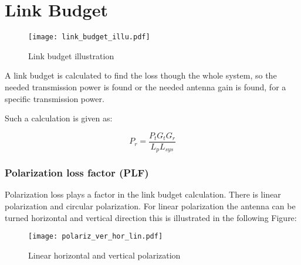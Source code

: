 \chapter{Link Budget}

\begin{figure}[H]
\centering
\texttt{[image: link\_budget\_illu.pdf]}
\caption{Link budget illustration}
\label{dijdkkfkf}
\end{figure}







A link budget is calculated to find the loss though the whole system, so the needed transmission power is found or the needed antenna gain is found, for a specific transmission power.

Such a calculation is given as:

\begin{equation}
P_{r} = \frac{P_{t}G_{t}G_{r}}{L_{p}L_{sys}}
\label{link_calc}
\end{equation}

\begin{where}
\end{where}
\newpage
\subsection{Polarization loss factor (PLF)}
Polarization loss \citep{PLF} plays a factor in the link budget calculation. There is linear polarization and circular polarization. For linear polarization the antenna can be turned horizontal and vertical direction this is illustrated in the following Figure:

\begin{figure}[H]
\centering
\texttt{[image: polariz\_ver\_hor\_lin.pdf]}
\caption{Linear horizontal and vertical polarization \citep{plf_illu}}
\label{fig:pol_ver_hor}
\end{figure} 

